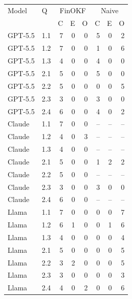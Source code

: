 \begin{tabular}{llrrrrrr}
\toprule
Model & Q & \multicolumn{3}{c}{FinOKF} & \multicolumn{3}{c}{Naive}\\
 & & C & E & O & C & E & O\\
\midrule
GPT-5.5 & 1.1 & 7 & 0 & 0 & 5 & 0 & 2\\
GPT-5.5 & 1.2 & 7 & 0 & 0 & 1 & 0 & 6\\
GPT-5.5 & 1.3 & 4 & 0 & 0 & 4 & 0 & 0\\
GPT-5.5 & 2.1 & 5 & 0 & 0 & 5 & 0 & 0\\
GPT-5.5 & 2.2 & 5 & 0 & 0 & 0 & 0 & 5\\
GPT-5.5 & 2.3 & 3 & 0 & 0 & 3 & 0 & 0\\
GPT-5.5 & 2.4 & 6 & 0 & 0 & 4 & 0 & 2\\
Claude & 1.1 & 7 & 0 & 0 & -- & -- & --\\
Claude & 1.2 & 4 & 0 & 3 & -- & -- & --\\
Claude & 1.3 & 4 & 0 & 0 & -- & -- & --\\
Claude & 2.1 & 5 & 0 & 0 & 1 & 2 & 2\\
Claude & 2.2 & 5 & 0 & 0 & -- & -- & --\\
Claude & 2.3 & 3 & 0 & 0 & 3 & 0 & 0\\
Claude & 2.4 & 6 & 0 & 0 & -- & -- & --\\
Llama & 1.1 & 7 & 0 & 0 & 0 & 0 & 7\\
Llama & 1.2 & 6 & 1 & 0 & 0 & 1 & 6\\
Llama & 1.3 & 4 & 0 & 0 & 0 & 0 & 4\\
Llama & 2.1 & 5 & 0 & 0 & 0 & 0 & 5\\
Llama & 2.2 & 3 & 2 & 0 & 0 & 0 & 5\\
Llama & 2.3 & 3 & 0 & 0 & 0 & 0 & 3\\
Llama & 2.4 & 4 & 0 & 2 & 0 & 0 & 6\\
\bottomrule
\end{tabular}
